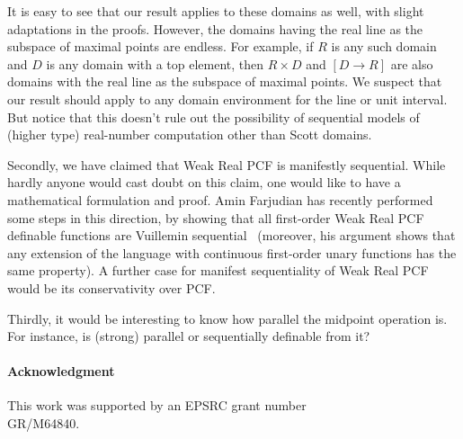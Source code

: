 \documentclass[12pt]{article}
\begin{document}
It is easy to see that our result applies to these domains as well,
with slight adaptations in the proofs. However, the domains having the
real line as the subspace of maximal points are endless. For example,
if $R$ is any such domain and $D$ is any domain with a top element,
then $R \times D$ and $[D \to R]$ are also domains with the real line
as the subspace of maximal points.  We suspect that our result should
apply to any domain environment for the line or unit interval.  But
notice that this doesn't rule out the possibility of sequential models
of (higher type) real-number computation other than Scott domains.

Secondly, we have claimed that Weak Real PCF is manifestly sequential.
While hardly anyone would cast doubt on this claim, one would like to
have a mathematical formulation and proof. Amin Farjudian has recently
performed some steps in this direction, by showing that all
first-order Weak Real PCF definable functions are Vuillemin
sequential~\cite{amin:wrpcf} (moreover, his argument shows that any
extension of the language with continuous first-order unary functions
has the same property). A further case for manifest sequentiality of
Weak Real PCF would be its conservativity over PCF.

Thirdly, it would be interesting to know how parallel the midpoint
operation is. For instance, is (strong) parallel or sequentially
definable from it?

\paragraph{Acknowledgment}
This work was supported by an EPSRC grant number \\ GR/M64840.


{\footnotesize }
\end{document}
